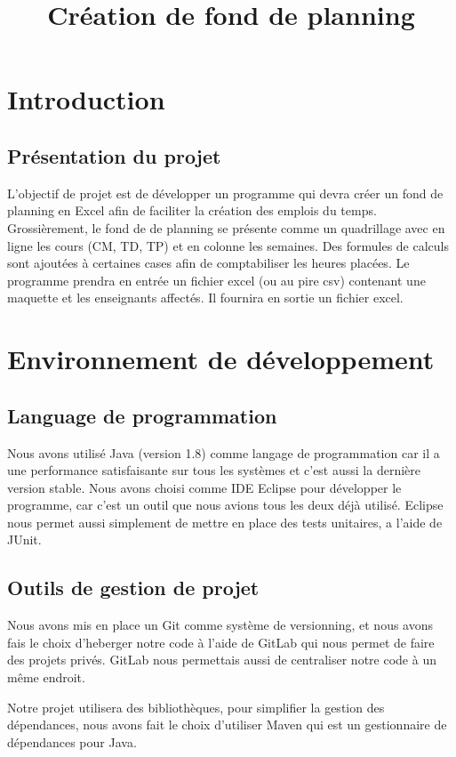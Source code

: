 \documentclass{polytech/polytech}
\title{Création de fond de planning}
\begin{document}
	\chapter{Introduction}
	\section{Présentation du projet}
	L’objectif de projet est de développer un programme qui devra créer un fond de planning en Excel afin de faciliter la création des emplois du temps.
	Grossièrement, le fond de de planning se présente comme un quadrillage avec en ligne les cours (CM, TD, TP) et en colonne les semaines.
	Des formules de calculs sont ajoutées à certaines cases afin de comptabiliser les heures placées.
	Le programme prendra en entrée un fichier excel (ou au pire csv) contenant une maquette et les enseignants affectés. Il fournira en sortie un fichier excel.
	
	\chapter{Environnement de développement}
	\section{Language de programmation}
	Nous avons utilisé Java (version 1.8) comme langage de programmation car il a une performance satisfaisante sur tous les systèmes et c'est aussi la dernière version stable.
	Nous avons choisi comme IDE Eclipse pour développer le programme, car c'est un outil que nous avions tous les deux déjà utilisé.
	Eclipse nous permet aussi simplement de mettre en place des tests unitaires, a l'aide de JUnit.

	\section{Outils de gestion de projet}
	Nous avons mis en place un Git comme système de versionning, et nous avons fais le choix d'heberger notre code à l'aide de GitLab qui nous permet de faire des projets privés. GitLab nous permettais aussi de centraliser notre code à un même endroit.
	
	Notre projet utilisera des bibliothèques, pour simplifier la gestion des dépendances, nous avons fait le choix d'utiliser Maven qui est un gestionnaire de dépendances pour Java.
\end{document}
